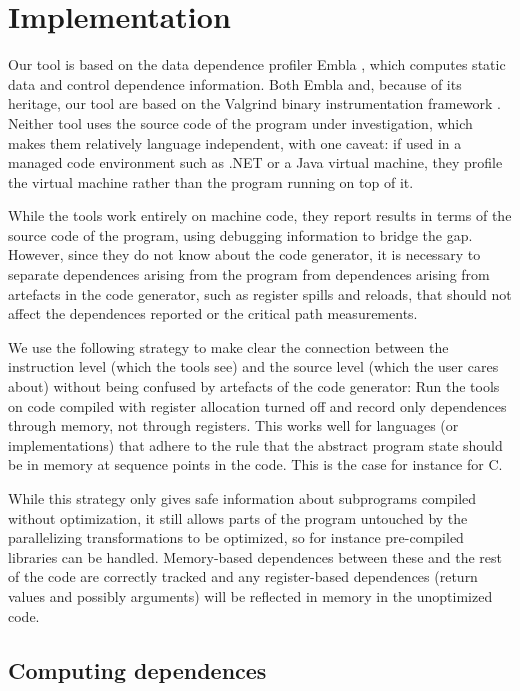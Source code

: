 \section{Implementation}

Our tool is based on the data dependence profiler Embla \cite{embla:08},
which computes static data and control dependence information.  Both Embla
and, because of its heritage, our tool are based on the Valgrind binary
instrumentation framework \cite{valgrind:07}. Neither tool uses the 
source code of the program under investigation, which makes them 
relatively language independent, with one caveat: if used in a managed
code environment such as .NET or a Java virtual machine, they profile the
virtual machine rather than the program running on top of it.

While the tools work entirely on machine code, they report results in terms 
of the source code of the program, using debugging information to bridge
the gap. However, since they do not know about the code generator, it is 
necessary to separate dependences arising from the program from 
dependences arising from artefacts in the code generator, such as 
register spills and reloads, that should not affect the dependences 
reported or the critical path measurements. 

We use the following strategy to make clear the connection between the 
instruction level (which the tools see) and the source level 
(which the user cares about) without being confused by artefacts of 
the code generator:
Run the tools on code compiled with register allocation turned off and 
record only dependences through memory, not through registers.
This works well for languages 
(or implementations) that adhere to the rule that the abstract program 
state should be in memory at sequence points in the code. This is the 
case for instance for C. 

While this strategy only gives safe information about subprograms compiled 
without optimization, it still allows parts of the program untouched by the 
parallelizing transformations to be optimized, so for instance pre-compiled 
libraries can be handled. Memory-based dependences between these and the 
rest of the code are correctly tracked 
and any register-based dependences (return values and possibly arguments)
will be reflected in memory in the
unoptimized code.


\subsection{Computing dependences}   \label{snca}

